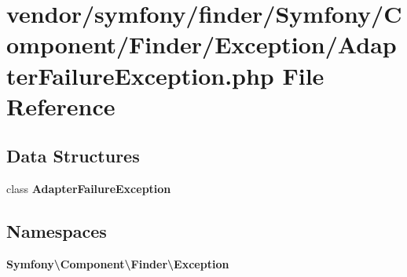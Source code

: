 \section{vendor/symfony/finder/\+Symfony/\+Component/\+Finder/\+Exception/\+Adapter\+Failure\+Exception.php File Reference}
\label{_adapter_failure_exception_8php}
\subsection*{Data Structures}
\begin{DoxyCompactItemize}
\item 
class {\bf Adapter\+Failure\+Exception}
\end{DoxyCompactItemize}
\subsection*{Namespaces}
\begin{DoxyCompactItemize}
\item 
 {\bf Symfony\textbackslash{}\+Component\textbackslash{}\+Finder\textbackslash{}\+Exception}
\end{DoxyCompactItemize}
